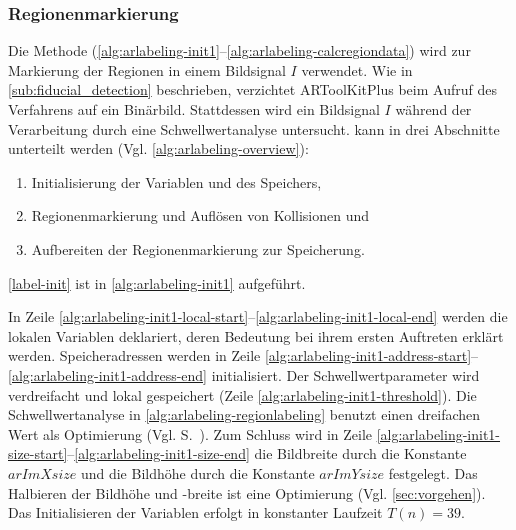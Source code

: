 \subsubsection{Regionenmarkierung} %
\label{sub:regionenmarkierung}

Die Methode  (\autoref{alg:arlabeling-init1}--\autoref{alg:arlabeling-calcregiondata}) wird zur
 Markierung der Regionen in einem Bildsignal $I$ verwendet. Wie in \autoref{sub:fiducial_detection} beschrieben,
 verzichtet ARToolKitPlus beim Aufruf des Verfahrens auf ein Binärbild. Stattdessen wird ein Bildsignal $I$ während der
 Verarbeitung durch eine Schwellwertanalyse untersucht.  kann in drei Abschnitte unterteilt werden
 (Vgl. \autoref{alg:arlabeling-overview}):
\begin{enumerate}
	\item Initialisierung der Variablen und des Speichers, \label{label-init}
	\item Regionenmarkierung und Auflösen von Kollisionen und \label{label-region}
	\item Aufbereiten der Regionenmarkierung zur Speicherung. \label{label-cleaning}
\end{enumerate}


\autoref{label-init} ist in \autoref{alg:arlabeling-init1} aufgeführt.

In Zeile \ref{alg:arlabeling-init1-local-start}--\ref{alg:arlabeling-init1-local-end} werden die lokalen Variablen
 deklariert, deren Bedeutung bei ihrem ersten Auftreten erklärt werden. Speicheradressen werden in Zeile
 \ref{alg:arlabeling-init1-address-start}--\ref{alg:arlabeling-init1-address-end} initialisiert. Der
 Schwellwertparameter wird verdreifacht und lokal gespeichert (Zeile \ref{alg:arlabeling-init1-threshold}). Die
 Schwellwertanalyse in \autoref{alg:arlabeling-regionlabeling} benutzt einen dreifachen Wert als Optimierung
 (Vgl. S.~\pageref{sub:arlabel-threshold}). Zum Schluss wird in Zeile
 \ref{alg:arlabeling-init1-size-start}--\ref{alg:arlabeling-init1-size-end} die Bildbreite durch die Konstante
 $\mathit{arImXsize}$ und die Bildhöhe durch die Konstante $\mathit{arImYsize}$ festgelegt. Das Halbieren der Bildhöhe
 und -breite ist eine Optimierung (Vgl. \autoref{sec:vorgehen}). Das Initialisieren der Variablen erfolgt in konstanter
 Laufzeit $T(n) = 39$.

